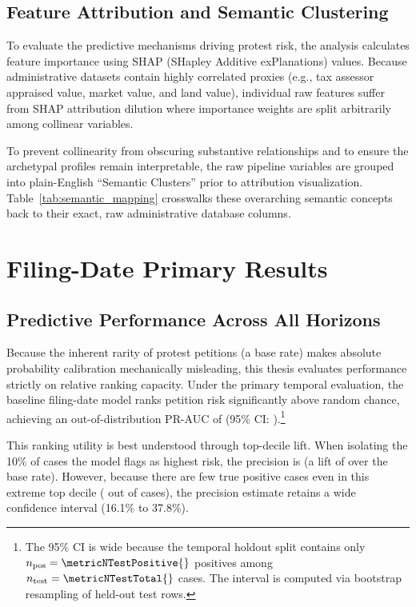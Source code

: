 \documentclass[11pt, letterpaper, oneside]{article}
\begin{document}
\subsection{Feature Attribution and Semantic Clustering}
\label{sec:feature_attribution}

To evaluate the predictive mechanisms driving protest risk, the analysis calculates feature importance using SHAP (SHapley Additive exPlanations) values. Because administrative datasets contain highly correlated proxies (e.g., tax assessor appraised value, market value, and land value), individual raw features suffer from SHAP attribution dilution where importance weights are split arbitrarily among collinear variables. 

To prevent collinearity from obscuring substantive relationships and to ensure the archetypal profiles remain interpretable, the raw pipeline variables are grouped into plain-English ``Semantic Clusters'' prior to attribution visualization. Table~\ref{tab:semantic_mapping} crosswalks these overarching semantic concepts back to their exact, raw administrative database columns.



\section{Filing-Date Primary Results}
\label{sec:results}

\subsection{Predictive Performance Across All Horizons}

Because the inherent rarity of protest petitions (a \metricBaseRate{} base rate) makes absolute probability calibration mechanically misleading, this thesis evaluates performance strictly on relative ranking capacity. Under the primary temporal evaluation, the baseline filing-date model ranks petition risk significantly above random chance, achieving an out-of-distribution PR-AUC of \metricBootstrapFiling{} (95\% CI: \metricBootstrapFilingCI{}).\footnote{The 95\% CI is wide because the temporal holdout split contains only $n_{\text{pos}} = \metricNTestPositive{}$ positives among $n_{\text{test}}=\metricNTestTotal{}$ cases. The interval is computed via bootstrap resampling of held-out test rows.}

This ranking utility is best understood through top-decile lift. When isolating the 10\% of cases the model flags as highest risk, the precision is \metricTopDecilePrecision{} (a lift of \metricTopDecileLift{} over the base rate). However, because there are few true positive cases even in this extreme top decile (\metricTopDecileTP{} out of \metricTopDecileN{} cases), the precision estimate retains a wide confidence interval (16.1\% to 37.8\%).
\end{document}
